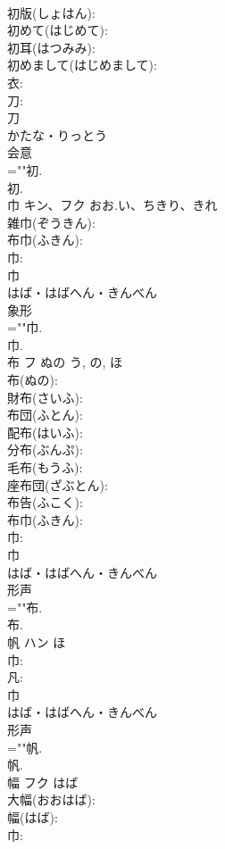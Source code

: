 \documentclass[8pt]{extreport}
\begin{document}
\begin{CJK}{UTF8}{min}
\\	初版(しょはん): 
\\	初めて(はじめて): 
\\	初耳(はつみみ): 
\\	初めまして(はじめまして): 
\\	衣: 
\\	刀: 
\\	刀	
\\	かたな・りっとう	
\\	会意 
\\	=""初.
\\	初.
\\	巾	キン、フク	おお.い、ちきり、きれ		
\\	雑巾(ぞうきん): 
\\	布巾(ふきん): 
\\	巾: 
\\	巾	
\\	はば・はばへん・きんべん	
\\	象形 
\\	=""巾.
\\	巾.
\\	布	フ	ぬの	う, の, ほ	
\\	布(ぬの): 
\\	財布(さいふ): 
\\	布団(ふとん): 
\\	配布(はいふ): 
\\	分布(ぶんぷ): 
\\	毛布(もうふ): 
\\	座布団(ざぶとん): 
\\	布告(ふこく): 
\\	布巾(ふきん): 
\\	巾: 
\\	巾	
\\	はば・はばへん・きんべん	
\\	形声 
\\	=""布.
\\	布.
\\	帆	ハン	ほ		
\\	巾: 
\\	凡: 
\\	巾	
\\	はば・はばへん・きんべん	
\\	形声 
\\	=""帆.
\\	帆.
\\	幅	フク	はば		
\\	大幅(おおはば): 
\\	幅(はば): 
\\	巾: 

\end{CJK}
\end{document}
